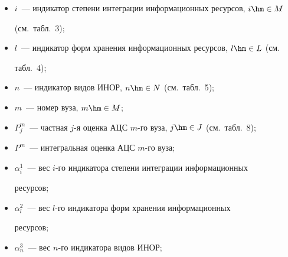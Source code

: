   \begin{itemize}


  \item


$i$~--- индикатор степени интеграции информационных ресурсов, $i\hm\in M$ 


(см.\ табл.~3);


  \item


$l$~--- индикатор форм хранения информационных ресурсов, $l\hm\in L$ (см.\ 


табл.~4);


  \item


$n$~--- индикатор видов ИНОР, $n\hm\in N$ (см.\ табл.~5);


  \item


$m$~--- номер вуза, $m\hm\in M$;


  \item


$P_j^m$~--- частная $j$-я оценка АЦС $m$-го вуза, $j\hm\in J$ (см.\ табл.~8);


  \item


$P^m$~--- интегральная оценка АЦС $m$-го вуза; 


  \item


$\alpha_i^1$~--- вес $i$-го индикатора степени интеграции информационных 


ресурсов;


  \item


$\alpha_l^2$~--- вес $l$-го индикатора форм хранения информационных 


ресурсов; 


  \item


$\alpha_n^3$~--- вес $n$-го индикатора видов ИНОР;





\begin{table}\small %




\begin{center}




\vspace*{2ex}






\end{center}
\end{table}
\end{itemize}
